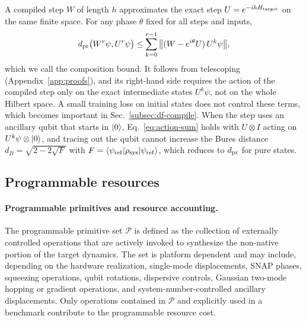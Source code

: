 \documentclass[pra,twocolumn,superscriptaddress,nofootinbib,floatfix]{revtex4-2}
\theoremstyle{remark}
\newcommand{\dpr}{d_{\rm pr}}
\newcommand{\revcolor}{\color{blue}}
\DeclareRobustCommand{\rev}[1]{{\revcolor #1}}
\begin{document}
\rev{A compiled step \(W\) of length \(h\) approximates the exact step \(U=e^{-ihH_{\rm target}}\) on the same finite space.} \rev{For any phase \(\theta\) fixed for all steps and inputs,}
\begingroup\revcolor
\begin{align}
\dpr\big(W^r\psi,U^r\psi\big)\le\sum_{k=0}^{r-1}\big\|(W-e^{i\theta}U)\,U^k\psi\big\| ,
\label{eq:action-sum}
\end{align}
\endgroup
\rev{which we call the composition bound.} \rev{It follows from telescoping (Appendix~\ref{app:proofs}), and its right-hand side requires the action of the compiled step only on the exact intermediate states \(U^k\psi\), not on the whole Hilbert space.} \rev{A small training loss on initial states does not control these terms, which becomes important in Sec.~\ref{subsec:df-compile}.} \rev{When the step uses an ancillary qubit that starts in \(\ket{0}\), Eq.~\eqref{eq:action-sum} holds with \(U\otimes I\) acting on \(U^k\psi\otimes\ket{0}\), and tracing out the qubit cannot increase the Bures distance \(d_B=\sqrt{2-2\sqrt F}\) with \(F=\langle\psi_{\rm ref}|\rho_{\rm sys}|\psi_{\rm ref}\rangle\), which reduces to \(\dpr\) for pure states.}

\subsection{\rev{Programmable resources}}
\label{subsec:resources}

\paragraph{Programmable primitives and resource accounting.}
The programmable primitive set \(\mathcal P\) is defined as the collection of externally controlled operations that are actively invoked to synthesize the non-native portion of the target dynamics. The set is platform dependent and may include, depending on the hardware realization, single-mode displacements, SNAP phases, squeezing operations, qubit rotations, dispersive controls, Gaussian two-mode hopping or gradient operations, and system-number-controlled ancillary displacements. Only operations contained in \(\mathcal P\) and explicitly used in a benchmark contribute to the programmable resource cost.
\end{document}
